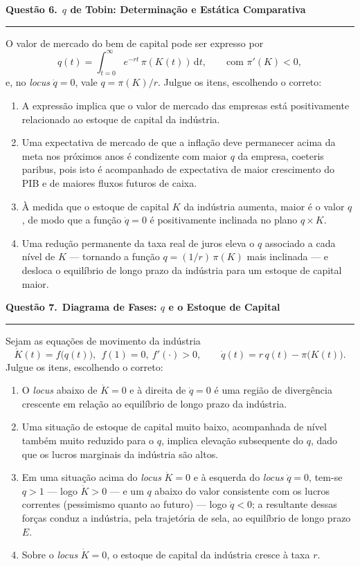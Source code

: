 \documentclass[12pt, a4paper]{article}
\newcommand{\dif}{\mathrm{d}}
\newcommand{\provaquestao}[2]{%
  \par\vspace{0.9em}%
  {\large\bfseries\color{cyanrbc} Questão #1.}\ {\bfseries #2}\par
  \vspace{-0.45em}\rule{\linewidth}{0.4pt}\par\vspace{0.1em}}
\begin{document}
\provaquestao{6}{$q$ de Tobin: Determinação e Estática Comparativa}

O valor de mercado do bem de capital pode ser expresso por
\[
q(t) = \int_{t=0}^{\infty} e^{-rt}\,\pi(K(t))\,\dif t,
\qquad\text{com } \pi'(K) < 0,
\]
e, no \emph{locus} $\dot{q}=0$, vale $q = \pi(K)/r$. Julgue os itens,
escolhendo o correto:

\begin{enumerate}[label=\alph*)]
\item A expressão implica que o valor de mercado das empresas está
positivamente relacionado ao estoque de capital da indústria.
\item Uma expectativa de mercado de que a inflação deve permanecer acima da
meta nos próximos anos é condizente com maior $q$ da empresa, coeteris paribus,
pois isto é acompanhado de expectativa de maior crescimento do PIB e de maiores
fluxos futuros de caixa.
\item À medida que o estoque de capital $K$ da indústria aumenta, maior é o
valor $q$, de modo que a função $\dot{q}=0$ é positivamente inclinada no plano
$q \times K$.
\item Uma redução permanente da taxa real de juros eleva o $q$ associado a cada
nível de $K$ --- tornando a função $q = (1/r)\,\pi(K)$ mais inclinada --- e
desloca o equilíbrio de longo prazo da indústria para um estoque de capital
maior.
\end{enumerate}

\provaquestao{7}{Diagrama de Fases: $q$ e o Estoque de Capital}

Sejam as equações de movimento da indústria
\[
\dot{K}(t) = f\bigl(q(t)\bigr),\ \ f(1)=0,\ f'(\cdot)>0,
\qquad
\dot{q}(t) = r\,q(t) - \pi\bigl(K(t)\bigr).
\]
Julgue os itens, escolhendo o correto:

\begin{enumerate}[label=\alph*)]
\item O \emph{locus} abaixo de $\dot{K}=0$ e à direita de $\dot{q}=0$ é uma
região de divergência crescente em relação ao equilíbrio de longo prazo da
indústria.
\item Uma situação de estoque de capital muito baixo, acompanhada de nível
também muito reduzido para o $q$, implica elevação subsequente do $q$, dado que
os lucros marginais da indústria são altos.
\item Em uma situação acima do \emph{locus} $\dot{K}=0$ e à esquerda do
\emph{locus} $\dot{q}=0$, tem-se $q>1$ --- logo $\dot{K}>0$ --- e um $q$ abaixo
do valor consistente com os lucros correntes (pessimismo quanto ao futuro) ---
logo $\dot{q}<0$; a resultante dessas forças conduz a indústria, pela
trajetória de sela, ao equilíbrio de longo prazo $E$.
\item Sobre o \emph{locus} $\dot{K}=0$, o estoque de capital da indústria
cresce à taxa $r$.
\end{enumerate}
\end{document}
